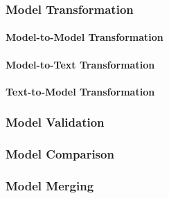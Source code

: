 \subsubsection{Model Transformation}

\paragraph{Model-to-Model Transformation}

\paragraph{Model-to-Text Transformation}

\paragraph{Text-to-Model Transformation}

\subsubsection{Model Validation}

\subsubsection{Model Comparison}

\subsubsection{Model Merging}


